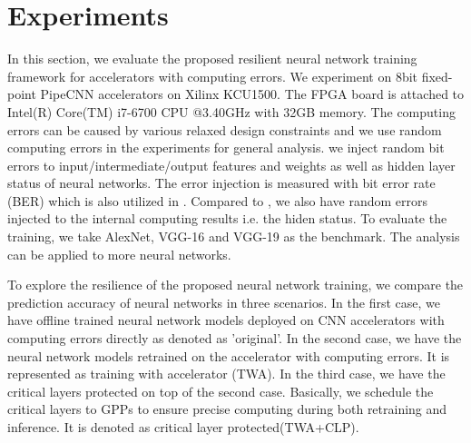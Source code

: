 \section{Experiments} \label{sec:casestudy}
In this section, we evaluate the proposed resilient neural network training 
framework for accelerators with computing errors. 
We experiment on 8bit fixed-point PipeCNN \cite{pipecnn_2} accelerators on Xilinx KCU1500.
The FPGA board is attached to Intel(R) Core(TM) i7-6700 CPU @3.40GHz with 32GB memory.
The computing errors can be caused by various relaxed design constraints and we use random computing 
errors in the experiments for general analysis.
we inject random bit errors to input/intermediate/output features and weights as well as 
hidden layer status of neural networks. The error injection is measured with 
bit error rate (BER) which is also utilized in \cite{B2018ARES}. Compared to \cite{B2018ARES},
we also have random errors injected to the internal computing results i.e. the hiden status. 
To evaluate the training, we take AlexNet, VGG-16 and VGG-19 as the benchmark. 
The analysis can be applied to more neural networks.

To explore the resilience of the proposed neural network training, we
compare the prediction accuracy of neural networks in three scenarios.
In the first case, we have offline trained neural network models deployed on 
CNN accelerators with computing errors directly as denoted as 'original'.
In the second case, we have the neural network models retrained on the 
accelerator with computing errors. It is represented as training with 
accelerator (TWA). In the third case, we have the critical layers 
protected on top of the second case. Basically, we schedule the critical layers to 
GPPs to ensure precise computing during both retraining and inference.
It is denoted as critical layer protected(TWA+CLP).

